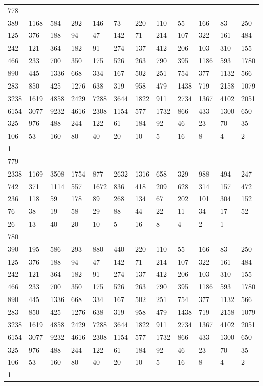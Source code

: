 \begin{longtable}{llllllllllll}
778&&&&&&&&&&&\\
389& 1168& 584& 292& 146& 73& 220& 110& 55& 166& 83& 250\\
125& 376& 188& 94& 47& 142& 71& 214& 107& 322& 161& 484\\
242& 121& 364& 182& 91& 274& 137& 412& 206& 103& 310& 155\\
466& 233& 700& 350& 175& 526& 263& 790& 395& 1186& 593& 1780\\
890& 445& 1336& 668& 334& 167& 502& 251& 754& 377& 1132& 566\\
283& 850& 425& 1276& 638& 319& 958& 479& 1438& 719& 2158& 1079\\
3238& 1619& 4858& 2429& 7288& 3644& 1822& 911& 2734& 1367& 4102& 2051\\
6154& 3077& 9232& 4616& 2308& 1154& 577& 1732& 866& 433& 1300& 650\\
325& 976& 488& 244& 122& 61& 184& 92& 46& 23& 70& 35\\
106& 53& 160& 80& 40& 20& 10& 5& 16& 8& 4& 2\\
1& \\

779&&&&&&&&&&&\\
2338& 1169& 3508& 1754& 877& 2632& 1316& 658& 329& 988& 494& 247\\
742& 371& 1114& 557& 1672& 836& 418& 209& 628& 314& 157& 472\\
236& 118& 59& 178& 89& 268& 134& 67& 202& 101& 304& 152\\
76& 38& 19& 58& 29& 88& 44& 22& 11& 34& 17& 52\\
26& 13& 40& 20& 10& 5& 16& 8& 4& 2& 1& \\

780&&&&&&&&&&&\\
390& 195& 586& 293& 880& 440& 220& 110& 55& 166& 83& 250\\
125& 376& 188& 94& 47& 142& 71& 214& 107& 322& 161& 484\\
242& 121& 364& 182& 91& 274& 137& 412& 206& 103& 310& 155\\
466& 233& 700& 350& 175& 526& 263& 790& 395& 1186& 593& 1780\\
890& 445& 1336& 668& 334& 167& 502& 251& 754& 377& 1132& 566\\
283& 850& 425& 1276& 638& 319& 958& 479& 1438& 719& 2158& 1079\\
3238& 1619& 4858& 2429& 7288& 3644& 1822& 911& 2734& 1367& 4102& 2051\\
6154& 3077& 9232& 4616& 2308& 1154& 577& 1732& 866& 433& 1300& 650\\
325& 976& 488& 244& 122& 61& 184& 92& 46& 23& 70& 35\\
106& 53& 160& 80& 40& 20& 10& 5& 16& 8& 4& 2\\
1& \\


\end{longtable}
